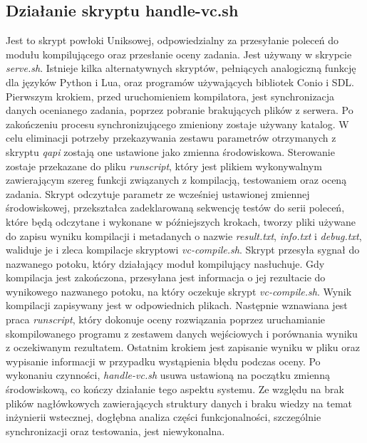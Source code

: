 \subsection{Działanie skryptu handle-vc.sh}
Jest to skrypt powłoki Uniksowej, odpowiedzialny za przesyłanie poleceń do modułu kompilującego oraz przesłanie oceny zadania. Jest używany w skrypcie \textit{serve.sh}. Istnieje kilka alternatywnych skryptów, pełniących analogiczną funkcję dla języków Python i Lua, oraz programów używających bibliotek Conio i SDL. Pierwszym krokiem, przed uruchomieniem kompilatora, jest synchronizacja danych ocenianego zadania, poprzez pobranie brakujących plików z serwera. Po zakończeniu procesu synchronizującego zmieniony zostaje używany katalog. W celu eliminacji potrzeby przekazywania zestawu parametrów otrzymanych z skryptu \textit{qapi} zostają one ustawione jako zmienna środowiskowa. Sterowanie zostaje przekazane do pliku \textit{runscript}, który jest plikiem wykonywalnym zawierającym szereg funkcji związanych z kompilacją, testowaniem oraz oceną zadania. Skrypt odczytuje parametr ze wcześniej ustawionej zmiennej środowiskowej, przekształca zadeklarowaną sekwencję testów do serii poleceń, które będą odczytane i wykonane w późniejszych krokach, tworzy pliki używane do zapisu wyniku kompilacji i metadanych o nazwie \textit{result.txt}, \textit{info.txt} i \textit{debug.txt}, waliduje je i zleca kompilacje skryptowi \textit{vc-compile.sh}. Skrypt przesyła sygnał do nazwanego potoku, który działający moduł kompilujący nasłuchuje. Gdy kompilacja jest zakończona, przesyłana jest informacja o jej rezultacie do wynikowego nazwanego potoku, na który oczekuje skrypt \textit{vc-compile.sh}. Wynik kompilacji zapisywany jest w odpowiednich plikach. Następnie wznawiana jest praca \textit{runscript}, który dokonuje oceny rozwiązania poprzez uruchamianie skompilowanego programu z zestawem danych wejściowych i porównania wyniku z oczekiwanym rezultatem. Ostatnim krokiem jest zapisanie wyniku w pliku oraz wypisanie informacji w przypadku wystąpienia błędu podczas oceny. Po wykonaniu czynności, \textit{handle-vc.sh} usuwa ustawioną na początku zmienną środowiskową, co kończy działanie tego aspektu systemu. Ze względu na brak plików nagłówkowych zawierających struktury danych i braku wiedzy na temat inżynierii wstecznej, dogłębna analiza części funkcjonalności, szczególnie synchronizacji oraz testowania, jest niewykonalna.
